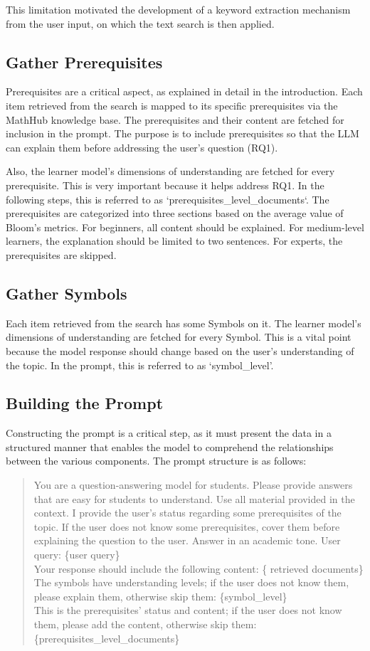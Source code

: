 This limitation motivated the development of a keyword extraction mechanism from the user input, on which the text search
is then applied.

\subsection{Gather Prerequisites}

Prerequisites are a critical aspect, as explained in detail in the introduction. Each item retrieved from the search is mapped to its specific prerequisites via the MathHub knowledge base. The
prerequisites and their content are fetched for inclusion in the prompt. The purpose is to include prerequisites so that the LLM can explain them before addressing the user's question (RQ1).

Also, the learner model's dimensions of understanding are fetched for every prerequisite. This is very important because it helps address RQ1.
In the following steps, this is referred to as `prerequisites\_level\_documents`.
The prerequisites are categorized into three sections based on the average value of Bloom's metrics. For beginners, all content should be explained. For medium-level learners, the explanation should be limited to two sentences. For experts, the prerequisites are skipped.
\subsection{Gather Symbols}
Each item retrieved from the search has some Symbols on it.
The learner model's dimensions of understanding are fetched for every Symbol.
This is a vital point because the model response should change based on the user's understanding of the topic.
In the prompt, this is referred to as `symbol\_level'.

\subsection{Building the Prompt}

Constructing the prompt is a critical step, as it must present the data in a structured manner that enables the model to comprehend the relationships between the various components. The prompt structure is as follows:
\begin{quote}
    You are a question-answering model for students. Please provide answers that are easy for students to understand.
    Use all material provided in the context.
    I provide the user's status regarding some prerequisites of the topic.
    If the user does not know some prerequisites, cover them before explaining the question to the user.
    Answer in an academic tone.
    User query: \{user query\}\\
    Your response should include the following content:
    \{ retrieved documents\}\\
    The symbols have understanding levels; if the user does not know them, please explain them, otherwise skip them:
    \{symbol\_level\}\\
    This is the prerequisites' status and content; if the user does not know them, please add the content, otherwise skip them:
    \{prerequisites\_level\_documents\}
\end{quote}

